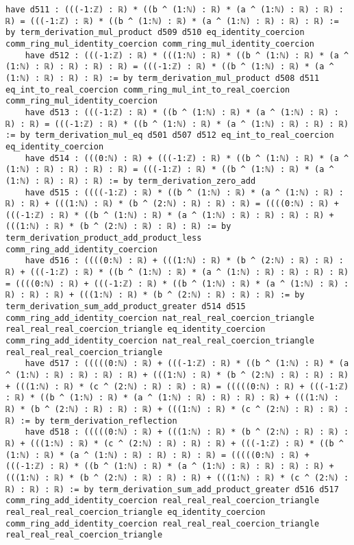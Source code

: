 \documentclass{article}
\begin{document}
\begin{tcolorbox}[colback=white!10, width=\linewidth]
\begin{lstlisting}[language=Lean4]
    have d511 : (((-1:ℤ) : ℝ) * ((b ^ (1:ℕ) : ℝ) * (a ^ (1:ℕ) : ℝ) : ℝ) : ℝ) = (((-1:ℤ) : ℝ) * ((b ^ (1:ℕ) : ℝ) * (a ^ (1:ℕ) : ℝ) : ℝ) : ℝ) := by term_derivation_mul_product d509 d510 eq_identity_coercion comm_ring_mul_identity_coercion comm_ring_mul_identity_coercion
    have d512 : (((-1:ℤ) : ℝ) * (((1:ℕ) : ℝ) * ((b ^ (1:ℕ) : ℝ) * (a ^ (1:ℕ) : ℝ) : ℝ) : ℝ) : ℝ) = (((-1:ℤ) : ℝ) * ((b ^ (1:ℕ) : ℝ) * (a ^ (1:ℕ) : ℝ) : ℝ) : ℝ) := by term_derivation_mul_product d508 d511 eq_int_to_real_coercion comm_ring_mul_int_to_real_coercion comm_ring_mul_identity_coercion
    have d513 : (((-1:ℤ) : ℝ) * ((b ^ (1:ℕ) : ℝ) * (a ^ (1:ℕ) : ℝ) : ℝ) : ℝ) = (((-1:ℤ) : ℝ) * ((b ^ (1:ℕ) : ℝ) * (a ^ (1:ℕ) : ℝ) : ℝ) : ℝ) := by term_derivation_mul_eq d501 d507 d512 eq_int_to_real_coercion eq_identity_coercion
    have d514 : (((0:ℕ) : ℝ) + (((-1:ℤ) : ℝ) * ((b ^ (1:ℕ) : ℝ) * (a ^ (1:ℕ) : ℝ) : ℝ) : ℝ) : ℝ) = (((-1:ℤ) : ℝ) * ((b ^ (1:ℕ) : ℝ) * (a ^ (1:ℕ) : ℝ) : ℝ) : ℝ) := by term_derivation_zero_add
    have d515 : ((((-1:ℤ) : ℝ) * ((b ^ (1:ℕ) : ℝ) * (a ^ (1:ℕ) : ℝ) : ℝ) : ℝ) + (((1:ℕ) : ℝ) * (b ^ (2:ℕ) : ℝ) : ℝ) : ℝ) = ((((0:ℕ) : ℝ) + (((-1:ℤ) : ℝ) * ((b ^ (1:ℕ) : ℝ) * (a ^ (1:ℕ) : ℝ) : ℝ) : ℝ) : ℝ) + (((1:ℕ) : ℝ) * (b ^ (2:ℕ) : ℝ) : ℝ) : ℝ) := by term_derivation_product_add_product_less comm_ring_add_identity_coercion
    have d516 : ((((0:ℕ) : ℝ) + (((1:ℕ) : ℝ) * (b ^ (2:ℕ) : ℝ) : ℝ) : ℝ) + (((-1:ℤ) : ℝ) * ((b ^ (1:ℕ) : ℝ) * (a ^ (1:ℕ) : ℝ) : ℝ) : ℝ) : ℝ) = ((((0:ℕ) : ℝ) + (((-1:ℤ) : ℝ) * ((b ^ (1:ℕ) : ℝ) * (a ^ (1:ℕ) : ℝ) : ℝ) : ℝ) : ℝ) + (((1:ℕ) : ℝ) * (b ^ (2:ℕ) : ℝ) : ℝ) : ℝ) := by term_derivation_sum_add_product_greater d514 d515 comm_ring_add_identity_coercion nat_real_real_coercion_triangle real_real_real_coercion_triangle eq_identity_coercion comm_ring_add_identity_coercion nat_real_real_coercion_triangle real_real_real_coercion_triangle
    have d517 : (((((0:ℕ) : ℝ) + (((-1:ℤ) : ℝ) * ((b ^ (1:ℕ) : ℝ) * (a ^ (1:ℕ) : ℝ) : ℝ) : ℝ) : ℝ) + (((1:ℕ) : ℝ) * (b ^ (2:ℕ) : ℝ) : ℝ) : ℝ) + (((1:ℕ) : ℝ) * (c ^ (2:ℕ) : ℝ) : ℝ) : ℝ) = (((((0:ℕ) : ℝ) + (((-1:ℤ) : ℝ) * ((b ^ (1:ℕ) : ℝ) * (a ^ (1:ℕ) : ℝ) : ℝ) : ℝ) : ℝ) + (((1:ℕ) : ℝ) * (b ^ (2:ℕ) : ℝ) : ℝ) : ℝ) + (((1:ℕ) : ℝ) * (c ^ (2:ℕ) : ℝ) : ℝ) : ℝ) := by term_derivation_reflection
    have d518 : (((((0:ℕ) : ℝ) + (((1:ℕ) : ℝ) * (b ^ (2:ℕ) : ℝ) : ℝ) : ℝ) + (((1:ℕ) : ℝ) * (c ^ (2:ℕ) : ℝ) : ℝ) : ℝ) + (((-1:ℤ) : ℝ) * ((b ^ (1:ℕ) : ℝ) * (a ^ (1:ℕ) : ℝ) : ℝ) : ℝ) : ℝ) = (((((0:ℕ) : ℝ) + (((-1:ℤ) : ℝ) * ((b ^ (1:ℕ) : ℝ) * (a ^ (1:ℕ) : ℝ) : ℝ) : ℝ) : ℝ) + (((1:ℕ) : ℝ) * (b ^ (2:ℕ) : ℝ) : ℝ) : ℝ) + (((1:ℕ) : ℝ) * (c ^ (2:ℕ) : ℝ) : ℝ) : ℝ) := by term_derivation_sum_add_product_greater d516 d517 comm_ring_add_identity_coercion real_real_real_coercion_triangle real_real_real_coercion_triangle eq_identity_coercion comm_ring_add_identity_coercion real_real_real_coercion_triangle real_real_real_coercion_triangle

\end{lstlisting}
\end{tcolorbox}
\end{document}
